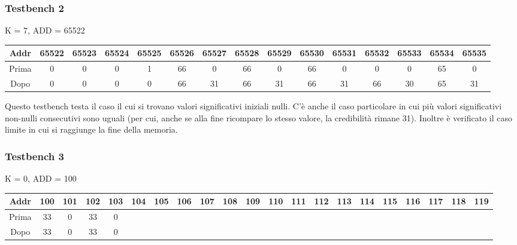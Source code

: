\documentclass{article}
\begin{document}
\subsubsection{Testbench 2}

K = 7, ADD = 65522
\begin{table}[htbp]
    \begin{adjustwidth}{-1.75cm}{}
    \centering
    \begin{tabular}{|c|*{14}{c|}}
        \hline
        Addr & 65522 & 65523 & 65524 & 65525 & 65526 & 65527 & 65528 & 65529 & 65530 & 65531 & 65532 & 65533 & 65534 & 65535 \\
        \hline
        Prima & 0 & 0 & 0 & 1 & 66 & 0 & 66 & 0 & 66 & 0 & 0 & 0 & 65 & 0 \\
        Dopo & 0 & 0 & 0 & 0 & 66 & 31 & 66 & 31 & 66 & 31 & 66 & 30 & 65 & 31 \\
        \hline
    \end{tabular}
    \end{adjustwidth}
\end{table}

Questo testbench testa il caso il cui si trovano valori significativi iniziali nulli. C’è anche il caso particolare in cui più valori significativi non-nulli consecutivi sono uguali (per cui, anche se alla fine ricompare lo stesso valore, la credibilità rimane 31). Inoltre è verificato il caso limite in cui si raggiunge la fine della memoria.

\subsubsection{Testbench 3}

K = 0, ADD = 100
\begin{table}[H]
    \begin{adjustwidth}{-1.75cm}{}
    \centering
    \begin{tabular}{|c|*{20}{c|}}
        \hline
        Addr & 100 & 101 & 102 & 103 & 104 & 105 & 106 & 107 & 108 & 109 & 110 & 111 & 112 & 113 & 114 & 115 & 116 & 117 & 118 & 119 \\
        \hline
        Prima & 33 & 0 & 33 & 0 & & & & & & & & & & & & & & & & \\
        Dopo & 33 & 0 & 33 & 0 & & & & & & & & & & & & & & & & \\
        \hline
    \end{tabular}
    \end{adjustwidth}
\end{table}
\end{document}
